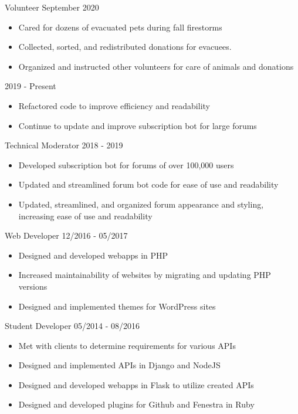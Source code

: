 \documentclass[11pt]{article} %
\begin{document}
\begin{description}
\squish
{}
           {Volunteer}
           {September 2020}

\begin{itemize}
  \item Cared for dozens of evacuated pets during fall firestorms
  \item Collected, sorted, and redistributed donations for evacuees.
  \item Organized and instructed other volunteers for care of animals and
    donations
\end{itemize}


            {}
            {2019 - Present}

\begin{itemize}
  \item Refactored code to improve efficiency and readability
  \item Continue to update and improve subscription bot for large forums
\end{itemize}


            {Technical Moderator}
            {2018 - 2019}

\begin{itemize}
  \item Developed subscription bot for forums of over 100,000 users
  \item Updated and streamlined forum bot code for ease of use and readability
  \item Updated, streamlined, and organized forum appearance and styling,
    increasing ease of use and readability
\end{itemize}


\squish
{}
           {Web Developer}
           {12/2016 - 05/2017}

\begin{itemize}
  \item Designed and developed webapps in PHP
  \item Increased maintainability of websites by migrating and updating PHP
    versions
  \item Designed and implemented themes for WordPress sites
\end{itemize}


           {Student Developer}
           {05/2014 - 08/2016}

\begin{itemize}
  \item Met with clients to determine requirements for various APIs
  \item Designed and implemented APIs in Django and NodeJS
  \item Designed and developed webapps in Flask to utilize created APIs
  \item Designed and developed plugins for Github and Fenestra in Ruby
\end{itemize}



\end{description}
\end{document}
